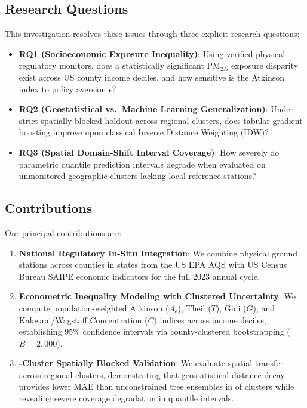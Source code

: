 \documentclass[conference]{IEEEtran}
\begin{document}
\subsection{Research Questions}
\label{sec:rqs}
This investigation resolves these issues through three explicit research questions:
\begin{itemize}
    \item \textbf{RQ1 (Socioeconomic Exposure Inequality)}: Using verified physical regulatory monitors, does a statistically significant $\mathrm{PM}_{2.5}$ exposure disparity exist across US county income deciles, and how sensitive is the Atkinson index to policy aversion $\epsilon$?
    \item \textbf{RQ2 (Geostatistical vs.\ Machine Learning Generalization)}: Under strict spatially blocked holdout across \numClusters{} regional clusters, does tabular gradient boosting improve upon classical Inverse Distance Weighting (IDW)?
    \item \textbf{RQ3 (Spatial Domain-Shift Interval Coverage)}: How severely do parametric quantile prediction intervals degrade when evaluated on unmonitored geographic clusters lacking local reference stations?
\end{itemize}

\subsection{Contributions}
Our principal contributions are:
\begin{enumerate}
    \item \textbf{National Regulatory In-Situ Integration}: We combine \numStations{} physical ground stations across \numCounties{} counties in \numStates{} states from the US EPA AQS with US Census Bureau SAIPE economic indicators for the full 2023 annual cycle.
    \item \textbf{Econometric Inequality Modeling with Clustered Uncertainty}: We compute population-weighted Atkinson ($A_\epsilon$), Theil ($T$), Gini ($G$), and Kakwani/Wagstaff Concentration ($C$) indices across income deciles, establishing 95\% confidence intervals via county-clustered bootstrapping ($B=2,000$).
    \item \textbf{\numClusters{}-Cluster Spatially Blocked Validation}: We evaluate spatial transfer across \numClusters{} regional clusters, demonstrating that geostatistical distance decay provides lower MAE than unconstrained tree ensembles in \idwBlockWins{} of \numClusters{} clusters while revealing severe coverage degradation in quantile intervals.
\end{enumerate}
\end{document}
